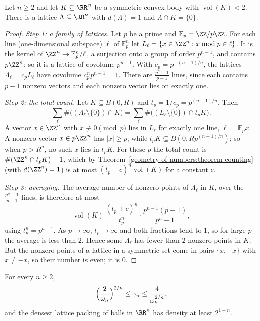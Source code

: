 \begin{theorem}\label{geometry-of-numbers:theorem-minkowski-hlawka}
Let $n \geq 2$ and let $K \subseteq \RR^n$ be a symmetric convex body with $\operatorname{vol}(K) < 2$. There is a lattice $\Lambda \subseteq \RR^n$ with $d(\Lambda) = 1$ and $\Lambda \cap K = \{0\}$.
\end{theorem}

\begin{proof}
\emph{Step 1: a family of lattices.} Let $p$ be a prime and $\mathbb{F}_p = \ZZ/p\ZZ$. For each line (one-dimensional subspace) $\ell$ of $\mathbb{F}_p^n$ let $L_\ell = \{x \in \ZZ^n : x \bmod p \in \ell\}$. It is the
kernel of $\ZZ^n \to \mathbb{F}_p^n/\ell$, a surjection onto a group of order $p^{n-1}$, and contains $p\ZZ^n$; so it is a lattice of covolume $p^{n-1}$. With $c_p = p^{-(n-1)/n}$, the lattices $\Lambda_\ell = c_pL_\ell$
have covolume $c_p^np^{n-1} = 1$. There are $\frac{p^n - 1}{p - 1}$ lines, since each contains $p - 1$ nonzero vectors and each nonzero vector lies on exactly one.

\emph{Step 2: the total count.} Let $K \subseteq B(0, R)$ and $t_p = 1/c_p = p^{(n-1)/n}$. Then
\[
\sum_\ell\#\bigl((\Lambda_\ell \setminus \{0\}) \cap K\bigr) = \sum_\ell\#\bigl((L_\ell \setminus \{0\}) \cap t_pK\bigr).
\]
A vector $x \in \ZZ^n$ with $x \not\equiv 0 \pmod p$ lies in $L_\ell$ for exactly one line, $\ell = \mathbb{F}_p\bar x$. A nonzero vector $x \in p\ZZ^n$ has $|x| \geq p$, while $t_pK \subseteq B(0, Rp^{(n-1)/n})$;
so when $p > R^n$, no such $x$ lies in $t_pK$. For these $p$ the total count is $\#(\ZZ^n \cap t_pK) - 1$, which by Theorem~\ref{geometry-of-numbers:theorem-counting} (with $d(\ZZ^n) = 1$) is at most
$(t_p + c)^n\operatorname{vol}(K)$ for a constant $c$.

\emph{Step 3: averaging.} The average number of nonzero points of $\Lambda_\ell$ in $K$, over the $\frac{p^n - 1}{p - 1}$ lines, is therefore at most
\[
\operatorname{vol}(K)\,\frac{(t_p + c)^n}{t_p^n}\cdot\frac{p^{n-1}(p - 1)}{p^n - 1},
\]
using $t_p^n = p^{n-1}$. As $p \to \infty$, $t_p \to \infty$ and both fractions tend to $1$, so for large $p$ the average is less than $2$. Hence some $\Lambda_\ell$ has fewer than $2$ nonzero points in
$K$. But the nonzero points of a lattice in a symmetric set come in pairs $\{x, -x\}$ with $x \neq -x$, so their number is even; it is $0$.
\end{proof}

\begin{corollary}\label{geometry-of-numbers:corollary-hermite-bounds}
For every $n \geq 2$,
\[
\Bigl(\frac{2}{\omega_n}\Bigr)^{2/n} \leq \gamma_n \leq \frac{4}{\omega_n^{2/n}},
\]
and the densest lattice packing of balls in $\RR^n$ has density at least $2^{1-n}$.
\end{corollary}

